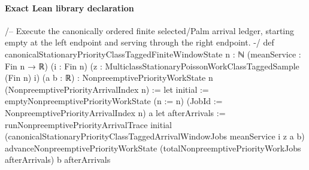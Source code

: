 \documentclass[10pt]{article}
\begin{document}
\paragraph{Exact Lean library declaration}
\begin{ReviewVerbatim}
/-- Execute the canonically ordered finite selected/Palm arrival ledger,
starting empty at the left endpoint and serving through the right endpoint. -/
def canonicalStationaryPriorityClassTaggedFiniteWindowState
    {n : ℕ} (meanService : Fin n → ℝ) (i : Fin n)
    (z : MulticlassStationaryPoissonWorkClassTaggedSample (Fin n) i)
    (a b : ℝ) :
    NonpreemptivePriorityWorkState n (NonpreemptivePriorityArrivalIndex n) :=
  let initial := emptyNonpreemptivePriorityWorkState
    (n := n) (JobId := NonpreemptivePriorityArrivalIndex n) a
  let afterArrivals := runNonpreemptivePriorityArrivalTrace initial
    (canonicalStationaryPriorityClassTaggedArrivalWindowJobs meanService i z a b)
  advanceNonpreemptivePriorityWorkState
    (totalNonpreemptivePriorityWorkJobs afterArrivals) b afterArrivals
\end{ReviewVerbatim}
\end{document}
